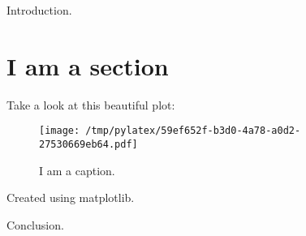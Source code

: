 \documentclass{article}%
\begin{document}
%
\normalsize%
Introduction.%
\section{I am a section}%
\label{sec:I am a section}%
Take a look at this beautiful plot:%


\begin{figure}[htbp]%
\centering%
\texttt{[image: /tmp/pylatex/59ef652f-b3d0-4a78-a0d2-27530669eb64.pdf]}%
\caption{I am a caption.}%
\end{figure}

%
Created using matplotlib.

%
Conclusion.%
\end{document}
